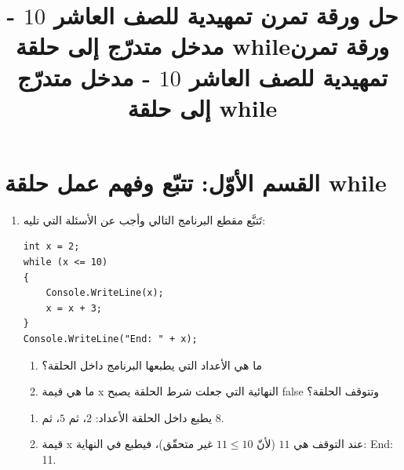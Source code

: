 \documentclass[14pt]{extarticle}
\title{حل ورقة تمرن تمهيدية للصف العاشر $10$ - مدخل متدرّج إلى حلقة \textenglish{while}}
\title{ورقة تمرن تمهيدية للصف العاشر $10$ - مدخل متدرّج إلى حلقة \textenglish{while}}
\begin{document}
\maketitle
\thispagestyle{fancy}
\section*{القسم الأوّل: تتبّع وفهم عمل حلقة \textenglish{while}}

\begin{enumerate}[itemsep=2em]

\item تَتبَّع مقطع البرنامج التالي وأجب عن الأسئلة التي تليه:
\begin{boxCode}
\begin{english}
\begin{verbatim}
int x = 2;
while (x <= 10)
{
    Console.WriteLine(x);
    x = x + 3;
}
Console.WriteLine("End: " + x);
\end{verbatim}
\end{english}
\end{boxCode}
\begin{enumerate}
    \item ما هي الأعداد التي يطبعها البرنامج داخل الحلقة؟
    \item ما هي قيمة \textenglish{x} النهائية التي جعلت شرط الحلقة يصبح \textenglish{false} وتتوقف الحلقة؟
\end{enumerate}
\ifwithsols
\begin{boxSolution}
\begin{enumerate}
    \item يطبع داخل الحلقة الأعداد: $2$، ثم $5$، ثم $8$.
    \item قيمة \textenglish{x} عند التوقف هي $11$ (لأنّ $11 \le 10$ غير متحقّق)، فيطبع في النهاية: \textenglish{End: 11}.
\end{enumerate}
\end{boxSolution}
\fi
\filbreak


\end{enumerate}
\end{document}
